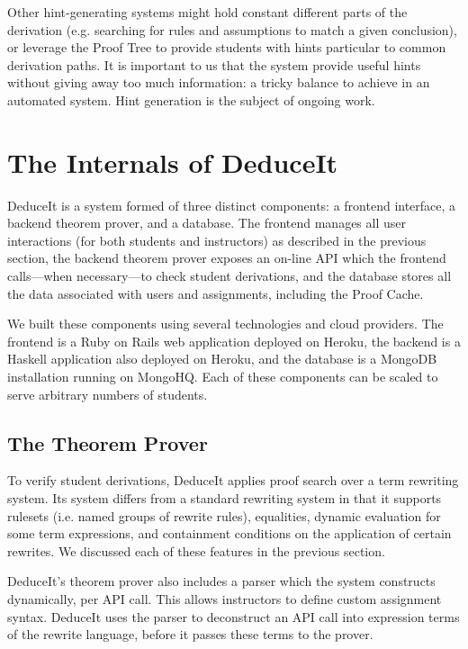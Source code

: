 \documentclass{sigchi}
\begin{document}
Other hint-generating systems might hold constant different parts of the derivation (e.g. searching for rules and assumptions to match a given conclusion), or leverage the Proof Tree to provide students with hints particular to common derivation paths. It is important to us that the system provide useful hints without giving away too much information: a tricky balance to achieve in an automated system. Hint generation is the subject of ongoing work.

\section{The Internals of DeduceIt}


DeduceIt is a system formed of three distinct components: a frontend interface, a backend theorem prover, and a database. The frontend manages all user interactions (for both students and instructors) as described in the previous section, the backend theorem prover exposes an on-line API which the frontend calls---when necessary---to check student derivations, and the database stores all the data associated with users and assignments, including the Proof Cache.

We built these components using several technologies and cloud providers. The frontend is a Ruby on Rails web application deployed on Heroku, the backend is a Haskell application also deployed on Heroku, and the database is a MongoDB installation running on MongoHQ. Each of these components can be scaled to serve arbitrary numbers of students.

\subsection{The Theorem Prover}

To verify student derivations, DeduceIt applies proof search over a term rewriting system. Its system differs from a standard rewriting system in that it supports rulesets (i.e. named groups of rewrite rules), equalities, dynamic evaluation for some term expressions, and containment conditions on the application of certain rewrites. We discussed each of these features in the previous section. 

DeduceIt's theorem prover also includes a parser which the system constructs dynamically, per API call. This allows instructors to define custom assignment syntax. DeduceIt uses the parser to deconstruct an API call into expression terms of the rewrite language, before it passes these terms to the prover.
\end{document}

